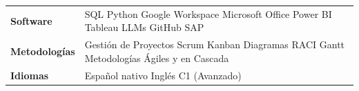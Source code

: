 \documentclass[12pt, a4paper]{article}
\begin{document}
\begin{tabularx}{\textwidth}{@{} >{\bfseries}l X @{}}
  Software    & SQL \textbullet{} Python \textbullet{} Google Workspace \textbullet{}
                Microsoft Office \textbullet{} Power BI \textbullet{} Tableau \textbullet{}
                LLMs \textbullet{} GitHub \textbullet{} SAP \\[3pt]
  Metodologías & Gestión de Proyectos \textbullet{} Scrum \textbullet{} Kanban \textbullet{}
                 Diagramas RACI \textbullet{} Gantt \textbullet{} Metodologías Ágiles
                 y en Cascada \\[3pt]
  Idiomas     & Español nativo \textbullet{} Inglés C1 (Avanzado) \\
\end{tabularx}

\end{document}
